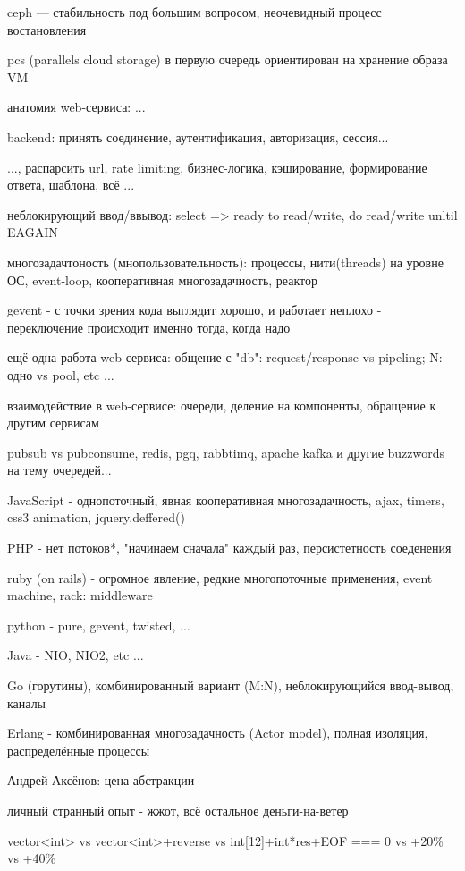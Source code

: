   \item ceph --- стабильность под большим вопросом, неочевидный процесс востановления
  \item pcs (parallels cloud storage) в первую очередь ориентирован на хранение образа VM
  \item анатомия web-сервиса: ...
  \item backend: принять соединение, аутентификация, авторизация, сессия...
  \item ..., распарсить url, rate limiting, бизнес-логика, кэширование, формирование ответа, шаблона, всё ...
  \item неблокирующий ввод/ввывод: select => ready to read/write, do read/write unltil EAGAIN
  \item многозадачтоность (мнопользовательность): процессы, нити(threads) на уровне ОС, event-loop, кооперативная многозадачность, реактор
  \item gevent - с точки зрения кода выглядит хорошо, и работает неплохо - переключение происходит именно тогда, когда надо
  \item ещё одна работа web-сервиса: общение с "db": request/response vs pipeling; N: одно vs pool, etc ...
  \item взаимодействие в web-сервисе: очереди, деление на компоненты, обращение к другим сервисам
  \item pubsub vs pubconsume, redis, pgq, rabbtimq, apache kafka и другие buzzwords на тему очередей...
  \item JavaScript - однопоточный, явная кооперативная многозадачность, ajax, timers, css3 animation, jquery.deffered()
  \item PHP - нет потоков*, "начинаем сначала" каждый раз, персистетность соеденения
  \item ruby (on rails) - огромное явление, редкие многопоточные применения, event machine, rack: middleware
  \item python - pure, gevent, twisted, ...
  \item Java - NIO, NIO2, etc ...
  \item Go (горутины), комбинированный вариант (M:N), неблокирующийся ввод-вывод, каналы
  \item Erlang - комбинированная многозадачность (Actor model), полная изоляция, распределённые процессы
  \item Андрей Аксёнов: цена абстракции
  \item личный странный опыт - жжот, всё остальное деньги-на-ветер
  \item vector<int> vs vector<int>+reverse vs int[12]+int*res+EOF === 0 vs +20\% vs +40\%
